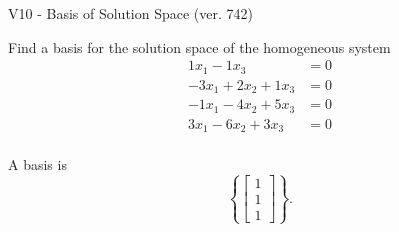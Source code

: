 \begin{exercise}
  \begin{exerciseTitle}V10 - Basis of Solution Space (ver. 742)\end{exerciseTitle}
  \begin{exerciseStatement}
    Find a basis for the solution space of the homogeneous system 
\begin{align*}
 1 x_ 1 -1 x_ 3 &= 0  \\ 
  -3 x_ 1 + 2 x_ 2 + 1 x_ 3 &= 0  \\ 
  -1 x_ 1 -4 x_ 2 + 5 x_ 3 &= 0  \\ 
  3 x_ 1 -6 x_ 2 + 3 x_ 3 &= 0  \\ 
 \end{align*}


 
  \end{exerciseStatement}

  \begin{exerciseAnswer}
   A basis is   
\[\left\{\left[\begin{array}{c}
1 \\
1 \\
1
\end{array}\right]\right\}.\]

  


  \end{exerciseAnswer}
\end{exercise}